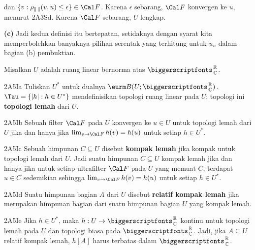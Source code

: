 {

\noindent dan
$\{v:\rho_{\|\,\|}(v,u)\le\epsilon\}\in\Cal F$.
Karena $\epsilon$ sebarang, $\Cal F$ konvergen ke $u$, menurut 2A3Sd.
Karena $\Cal F$ sebarang, $U$ lengkap.

\medskip

{\bf (c)}
Jadi kedua definisi itu bertepatan, setidaknya dengan syarat kita
memperbolehkan banyaknya pilihan serentak yang terhitung untuk $u_n$
dalam bagian (b) pembuktian.
}%

Misalkan $U$ adalah ruang linear bernorma atas $\RoverC$.

\spheader 2A5Ia Tuliskan $U^*$ untuk dualnya
$\eurm B(U;\RoverC)$. 
$\Tau=\{|h|:h\in U^*\}$ mendefinisikan topologi ruang linear pada
$U$; topologi ini
{\bf topologi lemah} dari $U$.

\spheader 2A5Ib Sebuah filter $\Cal F$ pada $U$ konvergen ke $u\in U$
untuk topologi lemah dari $U$ jika dan hanya jika
$\lim_{v\to\Cal F}h(v)=h(u)$ untuk setiap $h\in U^*$.

\spheader 2A5Ic Sebuah himpunan $C\subseteq U$ disebut
{\bf kompak lemah} jika kompak untuk topologi lemah dari $U$. Jadi
 suatu himpunan
$C\subseteq U$ kompak lemah jika dan hanya jika untuk setiap ultrafilter
$\Cal F$ pada $U$ yang memuat $C$, terdapat $u\in C$ sedemikian
sehingga $\lim_{v\to\Cal F}h(v)=h(u)$ untuk setiap
$h\in U^*$.

\spheader 2A5Id Suatu himpunan bagian $A$ dari $U$ disebut
{\bf relatif kompak lemah} jika merupakan himpunan bagian dari suatu
himpunan bagian $U$ yang kompak lemah.

\spheader 2A5Ie Jika $h\in U^*$, maka $h:U\to\RoverC$ kontinu untuk
topologi lemah pada $U$ dan topologi biasa pada $\RoverC$. Jadi,
jika $A\subseteq U$ relatif kompak lemah, $h[A]$ harus terbatas dalam
$\RoverC$. 

